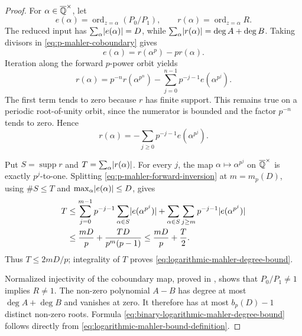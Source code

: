 \begin{proof}
For \(\alpha\in\overline{\mathbb{Q}}^{\times}\), let
\[
 e(\alpha)=\operatorname{ord}_{z=\alpha}(P_0/P_1),
 \qquad r(\alpha)=\operatorname{ord}_{z=\alpha}R.
\]
The reduced input has
\(\sum_\alpha\lvert e(\alpha) \rvert=D\), while
\(\sum_\alpha\lvert r(\alpha) \rvert=\deg A+\deg B\).  Taking divisors in
\eqref{eq:p-mahler-coboundary} gives
\begin{equation}\label{eq:p-mahler-divisor-recurrence}
 e(\alpha)=r(\alpha^p)-pr(\alpha).
\end{equation}
Iteration along the forward \(p\)-power orbit yields
\[
 r(\alpha)=p^{-n}r(\alpha^{p^n})
 -\sum_{j=0}^{n-1}p^{-j-1}e(\alpha^{p^j}).
\]
The first term tends to zero because \(r\) has finite support.  This remains
true on a periodic root-of-unity orbit, since the numerator is bounded and
the factor \(p^{-n}\) tends to zero.  Hence
\begin{equation}\label{eq:p-mahler-forward-inversion}
 r(\alpha)=-\sum_{j\ge0}p^{-j-1}e(\alpha^{p^j}).
\end{equation}

Put \(S=\operatorname{supp}r\) and
\(T=\sum_\alpha\lvert r(\alpha) \rvert\).  For every \(j\),
the map \(\alpha\mapsto\alpha^{p^j}\) on
\(\overline{\mathbb{Q}}^{\times}\) is exactly \(p^j\)-to-one.  Splitting
\eqref{eq:p-mahler-forward-inversion} at \(m=m_p(D)\), using
\(\#S\le T\) and \(\max_\alpha\lvert e(\alpha) \rvert\le D\), gives
\begin{align*}
 T
 &\le \sum_{j=0}^{m-1}p^{-j-1}
       \sum_{\alpha\in S}\lvert e(\alpha^{p^j}) \rvert
   +\sum_{\alpha\in S}\sum_{j\ge m}
       p^{-j-1}\lvert e(\alpha^{p^j}) \rvert\\
 &\le \frac{mD}{p}+\frac{TD}{p^m(p-1)}
 \le \frac{mD}{p}+\frac T2.
\end{align*}
Thus \(T\le2mD/p\); integrality of \(T\) proves
\eqref{eq:logarithmic-mahler-degree-bound}.

Normalized injectivity of the coboundary map, proved in
, shows that \(P_0/P_1\ne1\) implies
\(R\ne1\).  The non-zero polynomial \(A-B\) has degree at most
\(\deg A+\deg B\) and vanishes at zero.  It therefore has at most
\(b_p(D)-1\) distinct non-zero roots.  Formula
\eqref{eq:binary-logarithmic-mahler-degree-bound} follows directly from
\eqref{eq:logarithmic-mahler-bound-definition}.
\end{proof}

